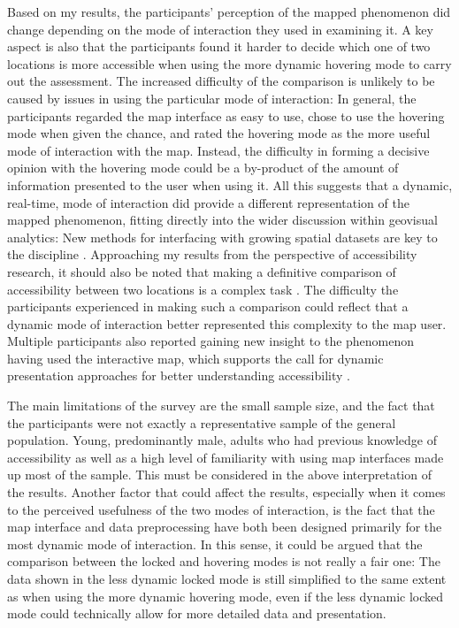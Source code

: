 Based on my results, the participants' perception of the mapped phenomenon did change
depending on the mode of interaction they used in examining it.
A key aspect is also that the participants found it harder to decide which one
of two locations is more accessible
when using the more dynamic hovering mode to carry out the assessment.
The increased difficulty of the
comparison is unlikely to be caused by
issues in using the particular mode of interaction:
In general, the participants regarded the map interface as easy to use,
chose to use the hovering mode when given the chance,
and rated the hovering mode as the more useful mode
of interaction with the map.
Instead, the difficulty in forming a decisive opinion with the hovering mode
could be a by-product of the amount of information presented to the user when using it.
All this suggests that a dynamic, real-time, mode of interaction did provide
a different representation of the mapped phenomenon,
fitting directly into the wider discussion within geovisual analytics:
New methods for interfacing with growing spatial datasets are key to the discipline
\parencite{rob2017b, and2010}.
Approaching my results from the perspective of accessibility research,
it should also be noted that making a definitive comparison of accessibility between
two locations is a complex task \parencite{geu2004, lev2020, hu2019}.
The difficulty the participants experienced in making such a comparison
could reflect that a dynamic mode of interaction
better represented this complexity to the map user.
Multiple participants also reported gaining new insight to the phenomenon
having used the interactive map,
which supports the call for dynamic presentation approaches
for better understanding accessibility \parencite{but2018, te2014}.

The main limitations of the survey are the small sample size,
and the fact that the participants were not exactly a representative sample
of the general population.
Young, predominantly male, adults who had previous knowledge of accessibility
as well as a high level of familiarity with using map interfaces made up most of the sample.
This must be considered in the above interpretation of the results.
Another factor that could affect the results,
especially when it comes to the perceived usefulness of the two modes of interaction,
is the fact that the map interface and data preprocessing have both been
designed primarily for the most dynamic mode of interaction.
In this sense, it could be argued that the comparison between the locked
and hovering modes is not really a fair one:
The data shown in the less dynamic locked mode is still
simplified to the same extent as when using the more dynamic hovering mode,
even if the less dynamic locked mode could technically allow for
more detailed data and presentation.


